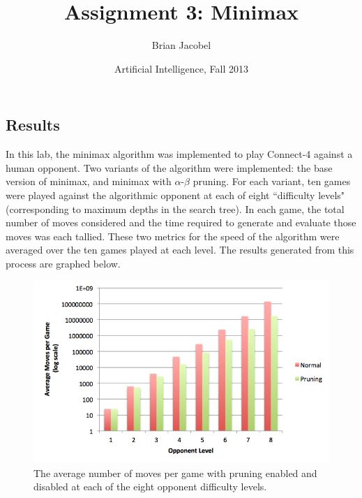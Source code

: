 \documentclass{article}
\title{Assignment 3: Minimax}
\author{Brian Jacobel}
\date{Artificial Intelligence, Fall 2013}
\begin{document}
\maketitle

\begin{doublespace}

\section{Results}
In this lab, the minimax algorithm was implemented to play Connect-4 against a human opponent. Two variants of the algorithm were implemented: the base version of minimax, and minimax with $\alpha$-$\beta$ pruning. For each variant, ten games were played against the algorithmic opponent at each of eight ``difficulty levels" (corresponding to maximum depths in the search tree). In each game, the total number of moves considered and the time required to generate and evaluate those moves was each tallied. These two metrics for the speed of the algorithm were averaged over the ten games played at each level. The results generated from this process are graphed below.

\begin{figure}[ht!]
\centering
\includegraphics[width=6.5in]{../Data/Graphs/Graph2}
\caption{The average number of moves per game with pruning enabled and disabled at each of the eight opponent difficulty levels.}
\end{figure}


\end{doublespace}
\end{document}
